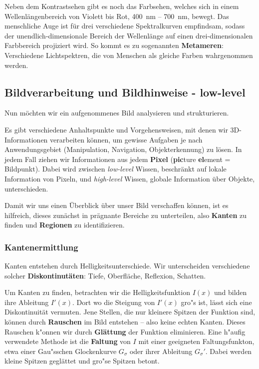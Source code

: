 Neben dem Kontrastsehen gibt es noch das Farbsehen, welches sich in einem Wellenlängenbereich von Violett bis Rot, 400~nm -- 700~nm, bewegt. Das menschliche Auge ist für drei verschiedene Spektralkurven empfindsam, sodass der unendlich-dimensionale Bereich der Wellenlänge auf einen drei-dimensionalen Farbbereich projiziert wird. So kommt es zu sogenannten \textbf{Metameren}: Verschiedene Lichtspektren, die von Menschen als gleiche Farben wahrgenommen werden.

\subsection{Bildverarbeitung und Bildhinweise - \glqq low-level\grqq}

Nun möchten wir ein aufgenommenes Bild analysieren und strukturieren.

Es gibt verschiedene Anhaltspunkte und Vorgehensweisen, mit denen wir 3D-Informationen verarbeiten können, um gewisse Aufgaben je nach Anwendungsgebiet (Manipulation, Navigation, Objekterkennung) zu lösen. In jedem Fall ziehen wir Informationen aus jedem \textbf{Pixel} (\textbf{pic}ture \textbf{el}ement = Bildpunkt). Dabei wird zwischen \textit{low-level} Wissen, beschränkt auf lokale Information von Pixeln, und \textit{high-level} Wissen, globale Information über Objekte, unterschieden.

Damit wir uns einen Überblick über unser Bild verschaffen können, ist es hilfreich, dieses zunächst in prägnante Bereiche zu unterteilen, also \textbf{Kanten} zu finden und \textbf{Regionen} zu identifizieren.

\subsubsection{Kantenermittlung}

Kanten entstehen durch Helligkeitsunterschiede. Wir unterscheiden verschiedene solcher \textbf{Diskontinutäten}: Tiefe, Oberfläche, Reflexion, Schatten.

Um Kanten zu finden, betrachten wir die Helligkeitsfunktion $I(x)$ und bilden ihre Ableitung $I'(x)$.
Dort wo die Steigung von $I'(x)$ gro"s ist, lässt sich eine Diskontinuität vermuten.
Jene Stellen, die nur kleinere Spitzen der Funktion sind, können durch \textbf{Rauschen} im Bild entstehen -- also keine echten Kanten.
Dieses Rauschen k"onnen wir durch \textbf{Glättung} der Funktion eliminieren. Eine h"aufig verwendete Methode ist die \textbf{Faltung} von $I$ mit einer geeigneten Faltungsfunkton, etwa einer Gau"sschen Glockenkurve $G_\sigma$ oder ihrer Ableitung $G_\sigma'$. Dabei werden kleine Spitzen geglättet und gro"se Spitzen betont.

